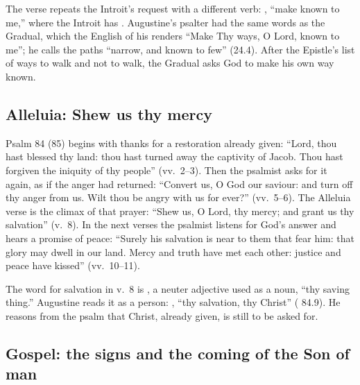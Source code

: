 The verse repeats the Introit's request with a different verb: , ``make known to me,'' where the Introit has .
Augustine's psalter had the same words as the Gradual, which the English of
his  renders ``Make Thy ways, O Lord, known to me''; he
calls the paths ``narrow, and known to few'' (24.4). After the Epistle's
list of ways to walk and not to walk, the Gradual asks God to make his own way
known.

\subsection{Alleluia: Shew us thy mercy}
\label{sec:element-alleluia}

Psalm 84 (85) begins with thanks for a restoration already given: ``Lord, thou
hast blessed thy land: thou hast turned away the captivity of Jacob. Thou hast
forgiven the iniquity of thy people'' (vv.~2--3). Then the psalmist asks for
it again, as if the anger had returned: ``Convert us, O God our saviour: and
turn off thy anger from us. Wilt thou be angry with us for ever?''
(vv.~5--6). The Alleluia verse is the climax of that prayer: ``Shew us, O
Lord, thy mercy; and grant us thy salvation'' (v.~8). In the next verses the
psalmist listens for God's answer and hears a promise of peace: ``Surely his
salvation is near to them that fear him: that glory may dwell in our land.
Mercy and truth have met each other: justice and peace have kissed''
(vv.~10--11).

The word for salvation in v.~8 is , a neuter adjective used as
a noun, ``thy saving thing.'' Augustine reads it as a person: , ``thy salvation, thy Christ'' (
84.9). He reasons from the psalm that Christ, already given, is still to be
asked for.

\subsection{Gospel: the signs and the coming of the Son of man}
\label{sec:element-gospel}

